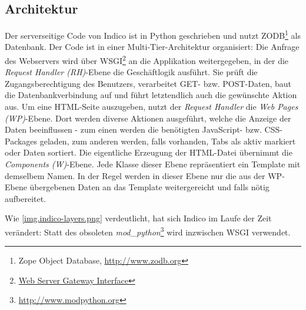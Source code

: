 \subsection{Architektur}
Der serverseitige Code von Indico ist in Python geschrieben und nutzt
ZODB\footnote{Zope Object Database, \href{http://www.zodb.org}{http://www.zodb.org}} als Datenbank.
Der Code ist in einer
Multi-Tier-Architektur organisiert: Die Anfrage des Webservers wird über
WSGI\footnote{\href{http://www.python.org/dev/peps/pep-0333/}{Web Server Gateway Interface}} an die
Applikation weitergegeben, in der die \emph{Request Handler (RH)}-Ebene die Geschäftlogik ausführt.
Sie prüft die Zugangsberechtigung des Benutzers, verarbeitet GET- bzw. POST-Daten, baut die
Datenbankverbindung auf und führt letztendlich auch die gewünschte Aktion aus. Um eine HTML-Seite
auszugeben, nutzt der \emph{Request Handler} die \emph{Web Pages (WP)}-Ebene. Dort werden diverse
Aktionen ausgeführt, welche die Anzeige der Daten beeinflussen - zum einen werden die benötigten
JavaScript- bzw. CSS-Packages geladen, zum anderen werden, falls vorhanden, Tabs als aktiv markiert
oder Daten sortiert. Die eigentliche Erzeugung der HTML-Datei übernimmt die \emph{Components
(W)}-Ebene. Jede Klasse dieser Ebene repräsentiert ein Template mit demselbem Namen. In der Regel
werden in dieser Ebene nur die aus der WP-Ebene übergebenen Daten an das Template weitergereicht und
falls nötig aufbereitet.

Wie \autoref{img.indico-layers.png} verdeutlicht, hat sich Indico im Laufe der Zeit verändert: Statt
des obsoleten \emph{mod\_python}\footnote{\href{http://www.modpython.org}{http://www.modpython.org}}
wird inzwischen WSGI verwendet.

